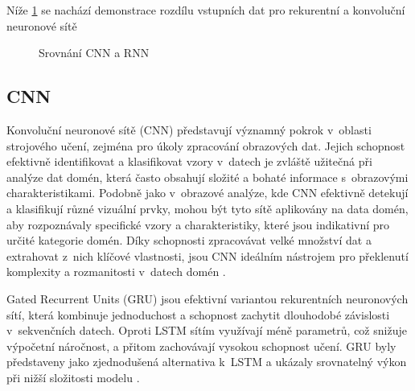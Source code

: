 Níže \ref{chart:cnn_rnn} se nachází demonstrace rozdílu vstupních dat pro rekurentní a konvoluční neuronové sítě



\begin{figure}[h!]
  \begin{center}
  \caption{Srovnání CNN a RNN}
  \end{center}\label{chart:cnn_rnn}
\end{figure}


\subsection{CNN}
Konvoluční neuronové sítě (CNN) představují významný pokrok v~oblasti strojového učení, zejména pro úkoly zpracování obrazových dat. Jejich schopnost efektivně identifikovat a klasifikovat vzory v~datech je zvláště užitečná při analýze dat domén, která často obsahují složité a bohaté informace s~obrazovými charakteristikami. Podobně jako v~obrazové analýze, kde CNN efektivně detekují a klasifikují různé vizuální prvky, mohou být tyto sítě aplikovány na data domén, aby rozpoznávaly specifické vzory a charakteristiky, které jsou indikativní pro určité kategorie domén. Díky schopnosti zpracovávat velké množství dat a extrahovat z~nich klíčové vlastnosti, jsou CNN ideálním nástrojem pro překlenutí komplexity a rozmanitosti v~datech domén \cite{cnn_data}.

Gated Recurrent Units (GRU) jsou efektivní variantou rekurentních neuronových sítí, která kombinuje jednoduchost a schopnost zachytit dlouhodobé závislosti v~sekvenčních datech. Oproti LSTM sítím využívají méně parametrů, což snižuje výpočetní náročnost, a přitom zachovávají vysokou schopnost učení. GRU byly představeny jako zjednodušená alternativa k~LSTM a ukázaly srovnatelný výkon při nižší složitosti modelu \cite{cho2014gru}.

